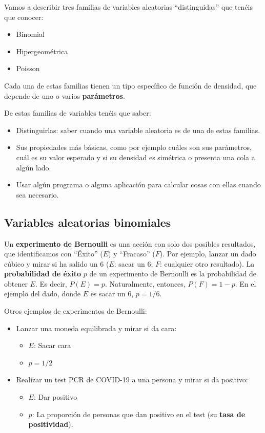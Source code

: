 \documentclass[
  spanish,
  letterpaper,
  DIV=11,
  numbers=noendperiod]{scrreprt}
\providecommand{\tightlist}{%
  \setlength{\itemsep}{0pt}\setlength{\parskip}{0pt}}
\begin{document}
Vamos a describir tres familias de variables aleatorias ``distinguidas''
que tenéis que conocer:

\begin{itemize}
\tightlist
\item
  Binomial
\item
  Hipergeométrica
\item
  Poisson
\end{itemize}

Cada una de estas familias tienen un tipo específico de función de
densidad, que depende de uno o varios \textbf{parámetros}.

De estas familias de variables tenéis que saber:

\begin{itemize}
\tightlist
\item
  Distinguirlas: saber cuando una variable aleatoria es de una de estas
  familias.
\item
  Sus propiedades más básicas, como por ejemplo cuáles son sus
  parámetros, cuál es su valor esperado y si su densidad es simétrica o
  presenta una cola a algún lado.
\item
  Usar algún programa o alguna aplicación para calcular cosas con ellas
  cuando sea necesario.
\end{itemize}

\subsection{Variables aleatorias
binomiales}\label{variables-aleatorias-binomiales}

Un \textbf{experimento de Bernoulli} es una acción con solo dos posibles
resultados, que identificamos con ``Éxito'' (\(E\)) y ``Fracaso''
(\(F\)). Por ejemplo, lanzar un dado cúbico y mirar si ha salido un 6
(\(E\): sacar un 6; \(F\): cualquier otro resultado). La
\textbf{probabilidad de éxito} \(p\) de un experimento de Bernoulli es
la probabilidad de obtener \(E\). Es decir, \(P(E)=p\). Naturalmente,
entonces, \(P(F)=1-p\). En el ejemplo del dado, donde \(E\) es sacar un
6, \(p=1/6\).

Otros ejemplos de experimentos de Bernoulli:

\begin{itemize}
\item
  Lanzar una moneda equilibrada y mirar si da cara:

  \begin{itemize}
  \tightlist
  \item
    \(E\): Sacar cara
  \item
    \(p=1/2\)
  \end{itemize}
\item
  Realizar un test PCR de COVID-19 a una persona y mirar si da positivo:

  \begin{itemize}
  \tightlist
  \item
    \(E\): Dar positivo
  \item
    \(p\): La proporción de personas que dan positivo en el test (su
    \textbf{tasa de positividad}).
  \end{itemize}
\end{itemize}
\end{document}
